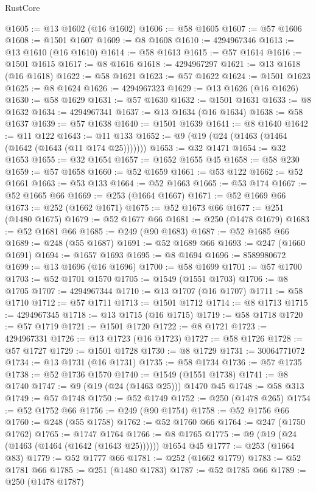 \begin{lexlean}{RustCore}
\begin{coremodule}
@1605 := @13 @1602 (@16 @1602)
@1606 := @58 @1605
@1607 := @57 @1606
@1608 := @1501 @1607
@1609 := @8 @1608
@1610 := 4294967346
@1613 := @13 @1610 (@16 @1610)
@1614 := @58 @1613
@1615 := @57 @1614
@1616 := @1501 @1615
@1617 := @8 @1616
@1618 := 4294967297
@1621 := @13 @1618 (@16 @1618)
@1622 := @58 @1621
@1623 := @57 @1622
@1624 := @1501 @1623
@1625 := @8 @1624
@1626 := 4294967323
@1629 := @13 @1626 (@16 @1626)
@1630 := @58 @1629
@1631 := @57 @1630
@1632 := @1501 @1631
@1633 := @8 @1632
@1634 := 4294967341
@1637 := @13 @1634 (@16 @1634)
@1638 := @58 @1637
@1639 := @57 @1638
@1640 := @1501 @1639
@1641 := @8 @1640
@1642 := @11 @122
@1643 := @11 @133
@1652 := @9 (@19 (@24 (@1463 (@1464 (@1642 (@1643 (@11 @174 @25)))))))
@1653 := @32 @1471
@1654 := @32 @1653
@1655 := @32 @1654
@1657 := @1652 @1655 @45
@1658 := @58 @230
@1659 := @57 @1658
@1660 := @52 @1659
@1661 := @53 @122
@1662 := @52 @1661
@1663 := @53 @133
@1664 := @52 @1663
@1665 := @53 @174
@1667 := @52 @1665 @66
@1669 := @253 (@1664 @1667)
@1671 := @52 @1669 @66
@1673 := @252 (@1662 @1671)
@1675 := @52 @1673 @66
@1677 := @251 (@1480 @1675)
@1679 := @52 @1677 @66
@1681 := @250 (@1478 @1679)
@1683 := @52 @1681 @66
@1685 := @249 (@90 @1683)
@1687 := @52 @1685 @66
@1689 := @248 (@55 @1687)
@1691 := @52 @1689 @66
@1693 := @247 (@1660 @1691)
@1694 := @1657 @1693
@1695 := @8 @1694
@1696 := 8589980672
@1699 := @13 @1696 (@16 @1696)
@1700 := @58 @1699
@1701 := @57 @1700
@1703 := @52 @1701 @1570
@1705 := @1549 (@1551 @1703)
@1706 := @8 @1705
@1707 := 4294967344
@1710 := @13 @1707 (@16 @1707)
@1711 := @58 @1710
@1712 := @57 @1711
@1713 := @1501 @1712
@1714 := @8 @1713
@1715 := 4294967345
@1718 := @13 @1715 (@16 @1715)
@1719 := @58 @1718
@1720 := @57 @1719
@1721 := @1501 @1720
@1722 := @8 @1721
@1723 := 4294967331
@1726 := @13 @1723 (@16 @1723)
@1727 := @58 @1726
@1728 := @57 @1727
@1729 := @1501 @1728
@1730 := @8 @1729
@1731 := 30064771072
@1734 := @13 @1731 (@16 @1731)
@1735 := @58 @1734
@1736 := @57 @1735
@1738 := @52 @1736 @1570
@1740 := @1549 (@1551 @1738)
@1741 := @8 @1740
@1747 := @9 (@19 (@24 (@1463 @25))) @1470 @45
@1748 := @58 @313
@1749 := @57 @1748
@1750 := @52 @1749
@1752 := @250 (@1478 @265)
@1754 := @52 @1752 @66
@1756 := @249 (@90 @1754)
@1758 := @52 @1756 @66
@1760 := @248 (@55 @1758)
@1762 := @52 @1760 @66
@1764 := @247 (@1750 @1762)
@1765 := @1747 @1764
@1766 := @8 @1765
@1775 := @9 (@19 (@24 (@1463 (@1464 (@1642 (@1643 @25)))))) @1654 @45
@1777 := @253 (@1664 @83)
@1779 := @52 @1777 @66
@1781 := @252 (@1662 @1779)
@1783 := @52 @1781 @66
@1785 := @251 (@1480 @1783)
@1787 := @52 @1785 @66
@1789 := @250 (@1478 @1787)

\end{coremodule}
\end{lexlean}
